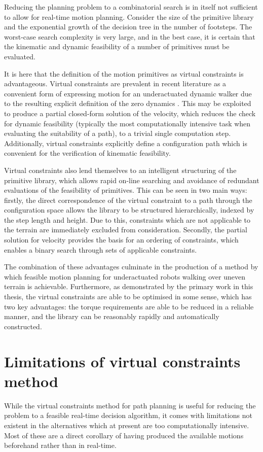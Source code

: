 Reducing the planning problem to a combinatorial search is in itself not sufficient to allow for real-time motion planning. Consider the size of the primitive library and the exponential growth of the decision tree in the number of footsteps. The worst-case search complexity is very large, and in the best case, it is certain that the kinematic and dynamic feasibility of a number of primitives must be evaluated.

It is here that the definition of the motion primitives as virtual constraints is advantageous. Virtual constraints are prevalent in recent literature as a convenient form of expressing motion for an underactuated dynamic walker due to the resulting explicit definition of the zero dynamics \cite{westervelt2003hybrid, sreenath2011compliant, martin2014design}. This may be exploited to produce a partial closed-form solution of the velocity, which reduces the check for dynamic feasibility (typically the most computationally intensive task when evaluating the suitability of a path), to a trivial single computation step. Additionally, virtual constraints explicitly define a configuration path which is convenient for the verification of kinematic feasibility.

Virtual constraints also lend themselves to an intelligent structuring of the primitive library, which allows rapid on-line searching and avoidance of redundant evaluations of the feasibility of primitives. This can be seen in two main ways: firstly, the direct correspondence of the virtual constraint to a path through the configuration space allows the library to be structured hierarchically, indexed by the step length and height. Due to this, constraints which are not applicable to the terrain are immediately excluded from consideration. Secondly, the partial solution for velocity provides the basis for an ordering of constraints, which enables a binary search through sets of applicable constraints. 

The combination of these advantages culminate in the production of a method by which feasible motion planning for underactuated robots walking over uneven terrain is achievable. Furthermore, as demonstrated by the primary work in this thesis, the virtual constraints are able to be optimised in some sense, which has two key advantages: the torque requirements are able to be reduced in a reliable manner, and the library can be reasonably rapidly and automatically constructed.

\section{Limitations of virtual constraints method}
While the virtual constraints method for path planning is useful for reducing the problem to a feasible real-time decision algorithm, it comes with limitations not existent in the alternatives which at present are too computationally intensive. Most of these are a direct corollary of having produced the available motions beforehand rather than in real-time.

